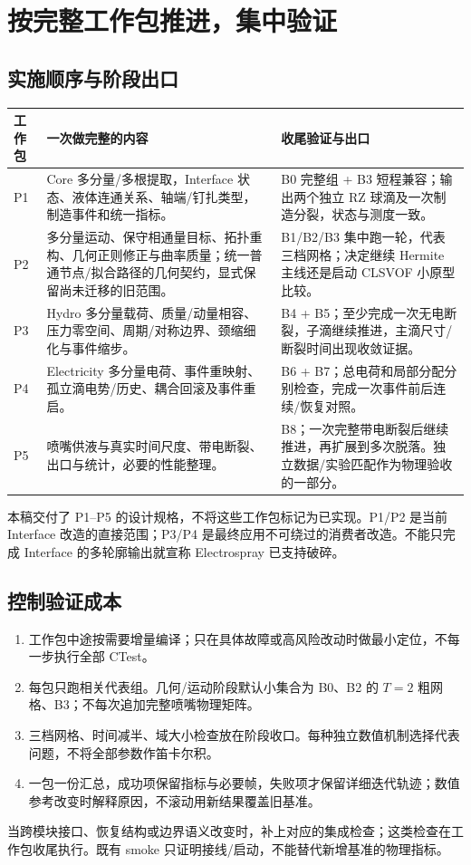 \documentclass[11pt,a4paper]{article}
\begin{document}
\section{按完整工作包推进，集中验证}
\subsection{实施顺序与阶段出口}
\begin{longtable}{L{13mm}L{66mm}L{68mm}}
\toprule 工作包 & 一次做完整的内容 & 收尾验证与出口\\\midrule\endhead
P1 & Core 多分量/多根提取，Interface 状态、液体连通关系、轴端/钉扎类型，制造事件和统一指标。 & B0 完整组 + B3 短程兼容；输出两个独立 RZ 球滴及一次制造分裂，状态与测度一致。\\
P2 & 多分量运动、保守相通量目标、拓扑重构、几何正则修正与曲率质量；统一普通节点/拟合路径的几何契约，显式保留尚未迁移的旧范围。 & B1/B2/B3 集中跑一轮，代表三档网格；决定继续 Hermite 主线还是启动 CLSVOF 小原型比较。\\
P3 & Hydro 多分量载荷、质量/动量相容、压力零空间、周期/对称边界、颈缩细化与事件缩步。 & B4 + B5；至少完成一次无电断裂，子滴继续推进，主滴尺寸/断裂时间出现收敛证据。\\
P4 & Electricity 多分量电荷、事件重映射、孤立滴电势/历史、耦合回滚及事件重启。 & B6 + B7；总电荷和局部分配分别检查，完成一次事件前后连续/恢复对照。\\
P5 & 喷嘴供液与真实时间尺度、带电断裂、出口与统计，必要的性能整理。 & B8；一次完整带电断裂后继续推进，再扩展到多次脱落。独立数据/实验匹配作为物理验收的一部分。\\\bottomrule
\end{longtable}
本稿交付了 P1--P5 的设计规格，不将这些工作包标记为已实现。P1/P2 是当前 Interface 改造的直接范围；P3/P4 是最终应用不可绕过的消费者改造。不能只完成 Interface 的多轮廓输出就宣称 Electrospray 已支持破碎。

\subsection{控制验证成本}
\begin{enumerate}
\item 工作包中途按需要增量编译；只在具体故障或高风险改动时做最小定位，不每一步执行全部 CTest。
\item 每包只跑相关代表组。几何/运动阶段默认小集合为 B0、B2 的 $T=2$ 粗网格、B3；不每次追加完整喷嘴物理矩阵。
\item 三档网格、时间减半、域大小检查放在阶段收口。每种独立数值机制选择代表问题，不将全部参数作笛卡尔积。
\item 一包一份汇总，成功项保留指标与必要帧，失败项才保留详细迭代轨迹；数值参考改变时解释原因，不滚动用新结果覆盖旧基准。
\end{enumerate}
当跨模块接口、恢复结构或边界语义改变时，补上对应的集成检查；这类检查在工作包收尾执行。既有 smoke 只证明接线/启动，不能替代新增基准的物理指标。
\end{document}
